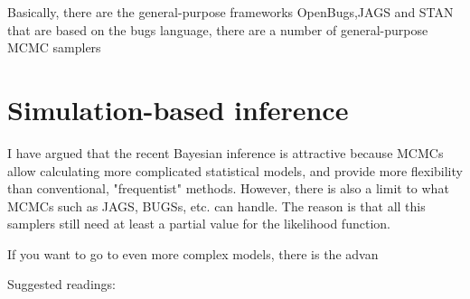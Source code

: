 \documentclass[10pt,a4paper]{article}
\begin{document}
Basically, there are the general-purpose frameworks OpenBugs,JAGS and STAN that are based on the bugs language, there are a number of general-purpose MCMC samplers 



\section{Simulation-based inference}

I have argued that the recent Bayesian inference is attractive because MCMCs allow calculating more complicated statistical models, and provide more flexibility than conventional, "frequentist" methods. However, there is also a limit to what MCMCs such as JAGS, BUGSs, etc. can handle. The reason is that all this samplers still need at least a partial value for the likelihood function. 

If you want to go to even more complex models, there is the advan



Suggested readings: \citep{Hartig-Statisticalinferencestochastic-2011}





\end{document}

